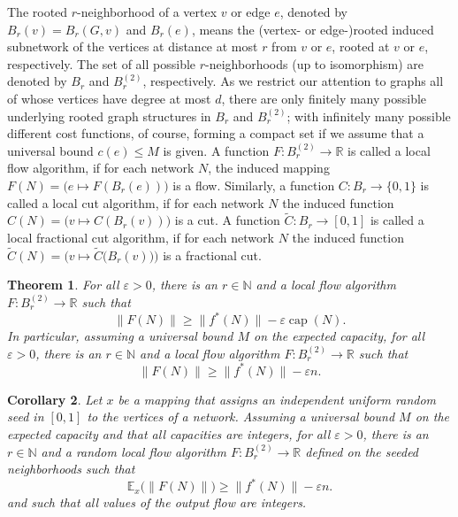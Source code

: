 \documentclass[12pt,a4paper]{article}
\newtheorem{Theorem}{Theorem}
\newtheorem{Corollary}[Theorem]{Corollary}
\newcommand{\capp}{\operatorname{cap}}
\newcommand{\eps}{\varepsilon}
\newcommand{\E}{\mathbb{E}}
\newcommand{\N}{\mathbb{N}}
\renewcommand{\:}{\colon}
\begin{document}
The rooted $r$-neighborhood of a vertex $v$ or edge $e$, denoted by $B_r(v) = B_r(G, v)$ and $B_r(e)$, means the (vertex- or edge-)rooted induced subnetwork of the vertices at distance at most $r$ from $v$ or $e$, rooted at $v$ or $e$, respectively. 
The set of all possible $r$-neighborhoods (up to isomorphism) are denoted by $B_r$ and $
B_r^{(2)}$, respectively. 
As we restrict our attention to graphs all of whose vertices have degree at most $d$, there are only finitely many possible underlying rooted graph structures in $B_r$ and $B_r^{(2)}$; with infinitely many possible different cost functions, of course, forming a compact set if we assume that a universal bound $c(e)\leq M$ is given. 
A function $F\: B_r^{(2)} \rightarrow \mathbb{R}$ is called a local flow algorithm, if for each network $N$, the induced mapping $F(N) = \big(e \mapsto F(B_r(e))\big)$ is a flow. 
Similarly, a function $C\: B_r \rightarrow \{0,1\}$ is called a local cut algorithm, if for each network $N$ the induced function $C(N) = \big(v \mapsto C(B_r(v))\big)$ is a cut. 
A function $\tilde{C}\: B_r \rightarrow [0, 1]$ is called a local fractional cut algorithm, if for each network $N$ the induced function $\tilde{C}(N) = \Big( v \mapsto \tilde{C}\big(B_r(v)\big)\Big)$ is a fractional cut. 


\begin{Theorem} \label{localg}
For all $\eps > 0$, there is an $r\in \N$ and a local flow algorithm $F\: B_r^{(2)} \rightarrow \mathbb{R}$ such that 
\begin{equation} \label{Thm1eq}
\big\|F(N)\big\| \ge \big\|f^*(N)\big\| - \eps \capp(N).
\end{equation}
In particular, assuming a universal bound $M$ on the expected capacity, for all $\eps > 0$, there is an $r\in \N$ and a local flow algorithm $F\: B_r^{(2)} \rightarrow \mathbb{R}$ such that 
\begin{equation} \label{Thm1eqbounded}
\big\|F(N)\big\| \ge \big\|f^*(N)\big\| - \eps n.
\end{equation}
\end{Theorem}

\begin{Corollary}\label{cor:integerflow}
Let $x$ be a mapping that assigns an independent uniform random seed in $[0,1]$ to the vertices of a network. 
Assuming a universal bound $M$ on the  expected capacity and that all capacities are integers, for all $\eps > 0$, there is an $r\in \N$ and a random local flow algorithm $F\: B_r^{(2)} \rightarrow \mathbb{R}$ defined on the seeded neighborhoods such that 
\begin{equation} \label{Thm1eqbounded}
\E_x\big(\big\|F(N)\big\|\big) \ge \big\|f^*(N)\big\| - \eps n.
\end{equation}
and such that all values of the output flow are integers. 
\end{Corollary}
\end{document}
